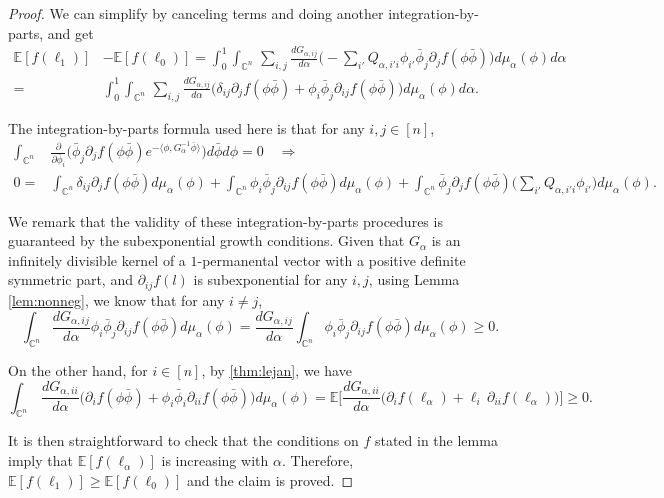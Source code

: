 \documentclass[a4paper, 11pt]{article}
\newcommand{\E}{\mathbb{E}}
\begin{document}
\begin{proof}
We can simplify by canceling terms and doing another integration-by-parts, and get
\begin{equation*}
\begin{aligned}
\E[f(\ell_1)]& -\E[f(\ell_0)]
=\int_0^1\int_{\mathbb{C}^n}\,
\sum_{i,j}\frac{d G_{\alpha,ij}}{d\alpha}\bigg(  -\sum_{i'}Q_{\alpha,i'i}\phi_{i'}\bar{\phi}_j\partial_j f(\phi\bar{\phi}) \bigg)
d\mu_\alpha(\phi)d\alpha\\
=&\int_0^1\int_{\mathbb{C}^n}\,
\sum_{i,j}\frac{d G_{\alpha,ij}}{d\alpha}\bigg(  \delta_{ij}\partial_j f(\phi\bar{\phi}) + \phi_i\bar{\phi}_j\partial_{ij} f(\phi\bar{\phi}) \bigg)
d\mu_\alpha(\phi)d\alpha.
\end{aligned}
\end{equation*}

The integration-by-parts formula used here is that for any $i,j\in[n]$,
\begin{equation*}
\begin{aligned}
\int_{\mathbb{C}^n} & \frac{\partial}{\partial \bar{\phi}_i}\big(\bar{\phi}_j \partial_j f(\phi\bar{\phi})e^{-\langle \phi, G_\alpha^{-1}\bar{\phi}\rangle}\big)d\bar{\phi} d\phi =0\quad\Rightarrow\\
0=& \int_{\mathbb{C}^n} \delta_{ij}\partial_j f(\phi\bar{\phi})d\mu_\alpha(\phi) +
\int_{\mathbb{C}^n}\phi_i\bar{\phi}_j\partial_{ij} f(\phi\bar{\phi})d\mu_\alpha(\phi) +
\int_{\mathbb{C}^n}\bar{\phi}_j\partial_j f(\phi\bar{\phi})\bigg(\sum_{i'}Q_{\alpha, i'i}\phi_{i'}\bigg)d\mu_\alpha(\phi).
\end{aligned}
\end{equation*}

We remark that the validity of these integration-by-parts procedures is guaranteed by the subexponential growth conditions. Given that $G_\alpha$ is an infinitely divisible kernel of a $1$-permanental vector with a positive definite symmetric part, and $\partial_{ij}f(l)$ is subexponential for any $i,j$, using Lemma \ref{lem:nonneg}, we know that for any $i\neq j$,
\[ \int_{\mathbb{C}^n} \frac{d G_{\alpha,ij}}{d\alpha}\phi_i\bar{\phi}_j\partial_{ij} f(\phi\bar{\phi})
d\mu_\alpha(\phi) = \frac{d G_{\alpha,ij}}{d\alpha}\int_{\mathbb{C}^n}\phi_i\bar{\phi}_j\partial_{ij} f(\phi\bar{\phi}) d\mu_\alpha(\phi)\geq 0.\]

On the other hand, for $i\in [n]$, by \cref{thm:lejan}, we have
\[\int_{\mathbb{C}^n}\, \frac{d G_{\alpha, ii}}{d \alpha}\Big(\partial_i f(\phi\bar{\phi})+\phi_i\bar{\phi}_i\partial_{ii} f(\phi\bar{\phi}) \Big)
d\mu_\alpha(\phi)=\E \bigg[\frac{d G_{\alpha, ii}}{d \alpha}\big(\partial_i f(\ell_\alpha)+\ell_i\,\partial_{ii}f(\ell_\alpha)\big)\bigg]\geq 0.\]

It is then straightforward to check that the conditions on $f$ stated in the lemma imply that $\E[f(\ell_\alpha)]$ is increasing with $\alpha$. Therefore, $\E[f(\ell_1)]\geq \E[f(\ell_0)]$ and the claim is proved.
\end{proof}
\end{document}
